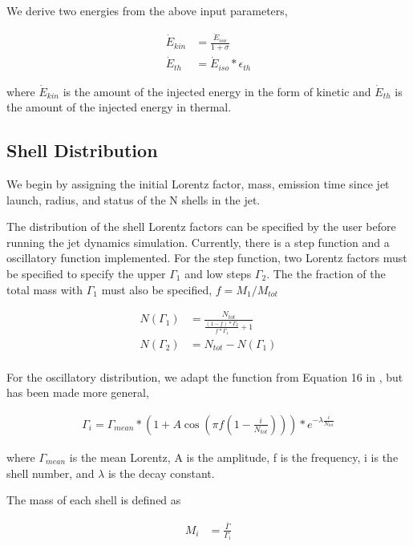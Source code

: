 \documentclass[linenumbers]{aastex631}
\begin{document}
We derive two energies from the above input parameters,

\begin{align}
	\dot{E}_{kin} &= \frac{\dot{E}_{iso}}{1+\sigma} \\
	\dot{E}_{th} &= \dot{E}_{iso} * \epsilon_{th}
\end{align}

where $\dot{E}_{kin}$ is the amount of the injected energy in the form of kinetic and $\dot{E}_{th}$ is the amount of the injected energy in thermal.


\subsection{Shell Distribution}

We begin by assigning the initial Lorentz factor, mass, emission time since jet launch, radius, and status of the N shells in the jet. 

The distribution of the shell Lorentz factors can be specified by the user before running the jet dynamics simulation. Currently, there is a step function and a oscillatory function implemented. For the step function, two Lorentz factors must be specified to specify the upper $\Gamma_1$ and low steps $\Gamma_2$. The the fraction of the total mass with $\Gamma_1$ must also be specified, $f=M_1/M_{tot}$

\begin{align}
	N(\Gamma_1) &= \frac{N_{tot}}{\frac{(1-f)*\Gamma_2}{f*\Gamma_1} + 1} \\
	N(\Gamma_2) &= N_{tot} - N(\Gamma_1) \\ 
\end{align}

 For the oscillatory distribution, we adapt the function from Equation 16 in \citet{2013A&A...551A.124H}, but has been made more general,

 \begin{align}
	\Gamma_i = \Gamma_{mean} * \left(1+A\cos\left(\pi f\left(1-\frac{i}{N_{tot}}\right)\right)\right)*e^{-\lambda \frac{i}{N_{tot}}} 
 \end{align}

where $\Gamma_{mean}$ is the mean Lorentz, A is the amplitude, f is the frequency, i is the shell number, and $\lambda$ is the decay constant.

The mass of each shell is defined as

\begin{align}
	M_i &= \frac{\bar{\Gamma}}{\Gamma_i} \\ 
\end{align}
\end{document}
